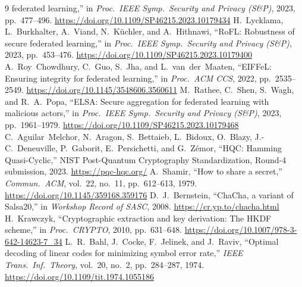\documentclass[lettersize,journal]{IEEEtran}
\begin{document}
\begin{thebibliography}{9}
federated learning,'' in \emph{Proc.\ IEEE Symp.\ Security and Privacy (S\&P)}, 2023,
pp.\ 477--496. \url{https://doi.org/10.1109/SP46215.2023.10179434}
 H.\ Lycklama, L.\ Burkhalter, A.\ Viand, N.\ K\"uchler, and A.\ Hithnawi,
``RoFL: Robustness of secure federated learning,'' in \emph{Proc.\ IEEE Symp.\ Security
and Privacy (S\&P)}, 2023, pp.\ 453--476. \url{https://doi.org/10.1109/SP46215.2023.10179400}
 A.\ Roy~Chowdhury, C.\ Guo, S.\ Jha, and L.\ van~der~Maaten,
``EIFFeL: Ensuring integrity for federated learning,'' in \emph{Proc.\ ACM CCS}, 2022,
pp.\ 2535--2549. \url{https://doi.org/10.1145/3548606.3560611}
 M.\ Rathee, C.\ Shen, S.\ Wagh, and R.\ A.\ Popa, ``ELSA: Secure
aggregation for federated learning with malicious actors,'' in \emph{Proc.\ IEEE Symp.\
Security and Privacy (S\&P)}, 2023, pp.\ 1961--1979. \url{https://doi.org/10.1109/SP46215.2023.10179468}
\bibitem{hqc} C.\ Aguilar~Melchor, N.\ Aragon, S.\ Bettaieb, L.\ Bidoux, O.\ Blazy,
J.-C.\ Deneuville, P.\ Gaborit, E.\ Persichetti, and G.\ Z\'emor, ``HQC: Hamming
Quasi-Cyclic,'' NIST Post-Quantum Cryptography Standardization, Round-4 submission,
2023. \url{https://pqc-hqc.org/}
 A.\ Shamir, ``How to share a secret,'' \emph{Commun.\ ACM},
vol.\ 22, no.\ 11, pp.\ 612--613, 1979. \url{https://doi.org/10.1145/359168.359176}
\bibitem{chacha20} D.\ J.\ Bernstein, ``ChaCha, a variant of Salsa20,'' in
\emph{Workshop Record of SASC}, 2008. \url{https://cr.yp.to/chacha.html}
\bibitem{hkdf} H.\ Krawczyk, ``Cryptographic extraction and key derivation: The HKDF
scheme,'' in \emph{Proc.\ CRYPTO}, 2010, pp.\ 631--648. \url{https://doi.org/10.1007/978-3-642-14623-7_34}
\bibitem{bcjr} L.\ R.\ Bahl, J.\ Cocke, F.\ Jelinek, and J.\ Raviv, ``Optimal decoding
of linear codes for minimizing symbol error rate,'' \emph{IEEE Trans.\ Inf.\ Theory},
vol.\ 20, no.\ 2, pp.\ 284--287, 1974. \url{https://doi.org/10.1109/tit.1974.1055186}
\end{thebibliography}
\end{document}
